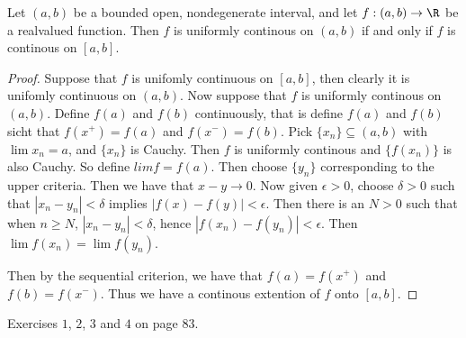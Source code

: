 \begin{theorem}\label{3.4.3}
    Let $(a,b)$ be a bounded open, nondegenerate interval, and let  $f:(a,b) \rightarrow \R$ be a realvalued function.
    Then  $f$ is uniformly continous on  $(a,b)$ if and only if  $f$ is continous on $[a,b]$.
\end{theorem}
\begin{proof}
    Suppose that $f$ is unifomly continuous on  $[a,b]$, then clearly it is unifomly 
    continuous on $(a,b)$. Now suppose that  $f$ is uniformly continous on  $(a,b)$. Define 
    $f(a)$ and  $f(b)$ continuously, that is define  $f(a)$ and  $f(b)$ sicht that 
    $f(x^+)=f(a)$ and  $f(x^-)=f(b)$. Pick  $\{x_n\} \subseteq (a,b)$ with $\lim{x_n}=a$, and 
    $\{x_n\}$ is Cauchy. Then  $f$ is uniformly continous and  $\{f(x_n)\}$ is also Cauchy. So 
    define $lim{f}=f(a)$. Then choose $\{y_n\}$ corresponding to the upper criteria. Then we 
    have that  $x-y \rightarrow 0$. Now given  $\epsilon>0$, choose  $\delta>0$ such that  $|x_n-y_n|<\delta$ 
    implies  $|f(x)-f(y)|<\epsilon$. Then there is an  $N>0$ such that when $n \geq N$,  
    $|x_n-y_n|<\delta$, hence  $|f(x_n)-f(y_n)|<\epsilon$. Then $\lim{f(x_n)}=\lim{f(y_n)}$.

    Then by the sequential criterion, we have that  $f(a)=f(x^+)$ and  $f(b)=f(x^-)$. Thus 
    we have a continous extention of  $f$ onto  $[a,b]$.
\end{proof}

\begin{HW} 
    Exercises $1$, $2$, $3$ and  $4$ on page  $83$.
\end{HW}
